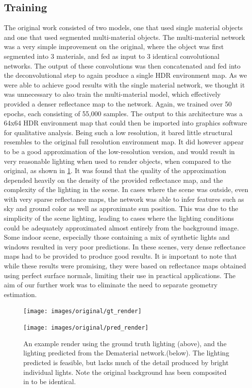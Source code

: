\documentclass[ %
                    author={Gavin Parker},
                supervisor={Dr. Neill Campbell},
                    degree={MEng},
                     title={Deep Learning for Illumination Estimation from Stereo Images},
                  subtitle={},
                      type={Research},
                      year={2018} ]{dissertation}
\begin{document}
\subsection{Training}
The original work consisted of two models, one that used single material objects and one that used segmented multi-material objects. The multi-material network was a very simple improvement on the original, where the object was first segmented into 3 materials, and fed as input to 3 identical convolutional networks. The output of these convolutions was then concatenated and fed into the deconvolutional step to again produce a single HDR environment map. As we were able to achieve good results with the single material network, we thought it was unnecessary to also train the multi-material model, which effectively provided a denser reflectance map to the network. Again, we trained over 50 epochs, each consisting of 55,000 samples. The output to this architecture was a 64x64 HDR environment map that could then be imported into graphics software for qualitative analysis. Being such a low resolution, it bared little structural resembles to the original full resolution environment map. It did however appear to be a good approximation of the low-resolution version, and would result in very reasonable lighting when used to render objects, when compared to the original, as shown in \ref{fig:demat_eg1}.
\newline
It was found that the quality of the approximation depended heavily on the density of the provided reflectance map, and the complexity of the lighting in the scene. In cases where the scene was outside, even with very sparse reflectance maps, the network was able to infer features such as sky and ground color as well as approximate sun position. This was due to the simplicity of the scene lighting, leading to cases where the lighting conditions could be adequately approximated almost entirely from the background image. Some indoor scene, especially those containing a mix of synthetic lights and windows resulted in very poor predictions. In these scenes, very dense reflectance maps had to be provided to produce good results.
\newline
It is important to note that while these results were promising, they were based on reflectance maps obtained using perfect surface normals, limiting their use in practical applications. The aim of our further work was to eliminate the need to separate geometry estimation.
\begin{figure}[H]
\centering
\texttt{[image: images/original/gt\_render]}
\vspace{0.5cm}

\centering
\texttt{[image: images/original/pred\_render]}
\caption{An example render using the ground truth lighting (above), and the lighting predicted from the Dematerial network.(below). The lighting predicted is feasible, but lacks much of the detail produced by bright individual lights. Note the original background has been composited in to be identical.}
\label{fig:demat_eg1}
\end{figure}
\end{document}
